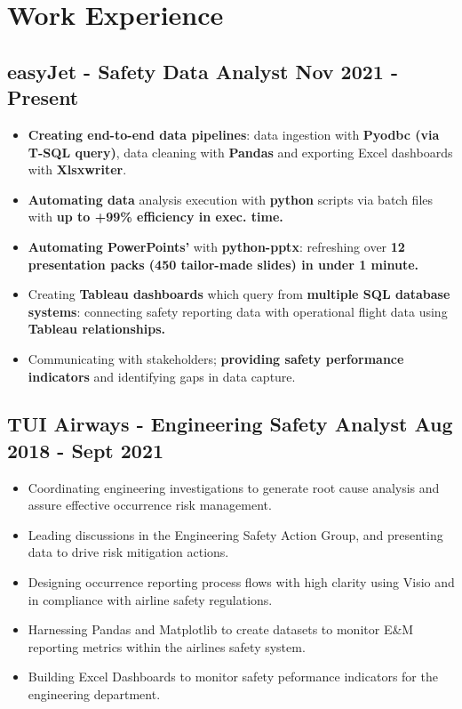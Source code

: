 \documentclass[a4paper,9pt]{article}
\begin{document}
\section*{Work Experience}
\subsection*{\textbf{easyJet - Safety Data Analyst} \hfill  Nov 2021 - Present}
\begin{itemize}[noitemsep]
	\item \textbf{Creating end-to-end data pipelines}: data ingestion with \textbf{Pyodbc (via T-SQL query)}, data cleaning with \textbf{Pandas} and exporting Excel dashboards with \textbf{Xlsxwriter}.
	\item \textbf{Automating data} analysis execution with \textbf{python} scripts via batch files with \textbf{up to +99\% efficiency in exec. time.}
	\item \textbf{Automating PowerPoints'} with \textbf{python-pptx}: refreshing over \textbf{12 presentation packs (450 tailor-made slides) in under 1 minute.}

	\item Creating \textbf{Tableau dashboards} which query from \textbf{multiple SQL database systems}: connecting safety reporting data with operational flight data using \textbf{Tableau relationships.}
	\item Communicating with stakeholders; \textbf{providing safety performance indicators} and identifying gaps in data capture.


\end{itemize}

\subsection*{\textbf{TUI Airways - Engineering Safety Analyst} \hfill  Aug 2018 - Sept 2021}
\begin{itemize}[noitemsep]
	\item Coordinating engineering investigations to generate root cause analysis and assure effective occurrence risk management.
	\item Leading discussions in the Engineering Safety Action Group, and presenting data to drive risk mitigation actions.
	\item Designing occurrence reporting process flows with high clarity using Visio and in compliance with airline safety regulations.
	\item Harnessing Pandas and Matplotlib to create datasets to monitor E\&M reporting metrics within the airlines safety system.
	\item Building Excel Dashboards to monitor safety peformance indicators for the engineering department.
\end{itemize}
\end{document}

